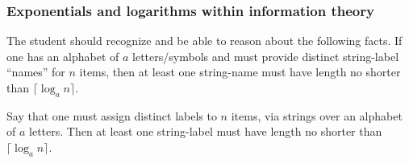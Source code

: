 \subsubsection{Exponentials and logarithms within information theory}
\label{sec:count-strings}

The student should recognize and be able to reason about the following
facts.  If one has an alphabet of $a$ letters/symbols and must provide
distinct string-label ``names'' for $n$ items, then at least one
string-name must have length no shorter than $\lceil \log_a n \rceil$.

\begin{prop}
\label{thm:bound-stringnames-lgth-k}
Say that one must assign distinct labels to $n$ items, via strings
over an alphabet of $a$ letters.  Then at least one string-label must
have length no shorter than $\lceil \log_a n \rceil$.
\end{prop}


